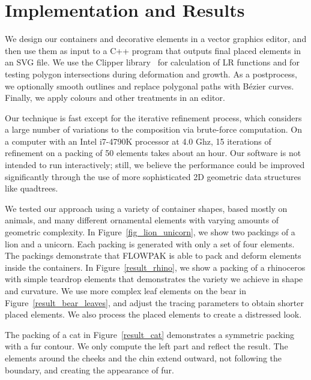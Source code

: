 \section{Implementation and Results}
\label{flowpak_implementation_and_results}



We design our containers and decorative elements in a vector graphics 
editor, and then use them as input to a C++ program that outputs final
placed elements in an SVG file.  We use the Clipper library~\cite{ClipperLib}
for calculation of LR functions and for testing polygon intersections 
during deformation and growth.
As a postprocess, we optionally smooth outlines and replace polygonal
paths with B\'{e}zier curves.
Finally, we apply colours and other treatments in an editor.

Our technique is fast except for the iterative refinement process,
which considers a large number of variations to the composition via
brute-force computation. On a computer with an Intel i7-4790K processor at 4.0 Ghz,
 15 iterations
of refinement on a packing of 50 elements takes about an hour.  Our
software is not intended to run interactively; still, we believe the
performance could be improved significantly through the use of more
sophisticated 2D geometric data structures like quadtrees.

We tested our approach using a variety of container shapes, based mostly
on animals, and many different ornamental elements with varying amounts
of geometric complexity.
In Figure~\ref{fig_lion_unicorn}, we show two packings of a lion and a unicorn.
Each packing is generated with only a set of four elements.
The packings demonstrate that FLOWPAK is able to pack and deform
elements inside the containers.
In Figure~\ref{result_rhino},
we show a packing of a rhinoceros with simple teardrop elements
that demonstrates the variety we achieve in shape and curvature.
We use more complex leaf elements on the bear in 
Figure~\ref{result_bear_leaves}, and
adjust the tracing parameters to obtain shorter placed elements. 
We also process the placed elements to create a distressed look.

The packing of a cat in Figure~\ref{result_cat} demonstrates 
a symmetric packing with a fur contour. 
We only compute the left part and reflect the result.
The elements around the cheeks and the chin extend outward, not following the boundary, and creating the appearance of fur.

